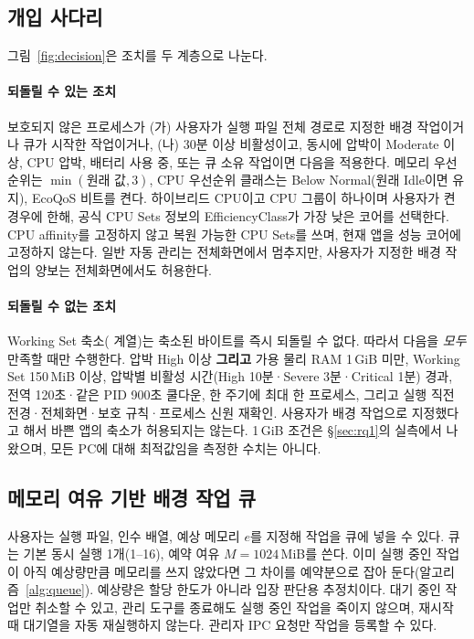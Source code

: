 \documentclass[11pt]{article}
\begin{document}
\subsection{개입 사다리}
\label{sec:ladder}
그림~\ref{fig:decision}은 조치를 두 계층으로 나눈다.

\paragraph{되돌릴 수 있는 조치}
보호되지 않은 프로세스가 (가) 사용자가 실행 파일 전체 경로로 지정한 배경 작업이거나 큐가 시작한 작업이거나, (나) 30분 이상 비활성이고, 동시에 압박이 Moderate 이상, CPU 압박, 배터리 사용 중, 또는 큐 소유 작업이면 다음을 적용한다. 메모리 우선순위는 $\min(\text{원래 값},3)$, CPU 우선순위 클래스는 Below Normal(원래 Idle이면 유지), EcoQoS 비트를 켠다\citep{mssetprocinfo,mspriority,ecoqos2021}. 하이브리드 CPU이고 CPU 그룹이 하나이며 사용자가 켠 경우에 한해, 공식 CPU Sets 정보의 EfficiencyClass가 가장 낮은 코어를 선택한다\citep{mscpusets}. CPU affinity를 고정하지 않고 복원 가능한 CPU Sets를 쓰며, 현재 앱을 성능 코어에 고정하지 않는다. 일반 자동 관리는 전체화면에서 멈추지만, 사용자가 지정한 배경 작업의 양보는 전체화면에서도 허용한다.

\paragraph{되돌릴 수 없는 조치}
Working Set 축소( 계열)는 축소된 바이트를 즉시 되돌릴 수 없다. 따라서 다음을 \emph{모두} 만족할 때만 수행한다. 압박 High 이상 \textbf{그리고} 가용 물리 RAM 1\,GiB 미만, Working Set 150\,MiB 이상, 압박별 비활성 시간(High 10분·Severe 3분·Critical 1분) 경과, 전역 120초·같은 PID 900초 쿨다운, 한 주기에 최대 한 프로세스, 그리고 실행 직전 전경·전체화면·보호 규칙·프로세스 신원 재확인. 사용자가 배경 작업으로 지정했다고 해서 바쁜 앱의 축소가 허용되지는 않는다. 1\,GiB 조건은 \S\ref{sec:rq1}의 실측에서 나왔으며, 모든 PC에 대해 최적값임을 측정한 수치는 아니다.

\subsection{메모리 여유 기반 배경 작업 큐}
\label{sec:queue}
사용자는 실행 파일, 인수 배열, 예상 메모리 $e$를 지정해 작업을 큐에 넣을 수 있다. 큐는 기본 동시 실행 1개(1--16), 예약 여유 $M=1024$\,MiB를 쓴다. 이미 실행 중인 작업이 아직 예상량만큼 메모리를 쓰지 않았다면 그 차이를 예약분으로 잡아 둔다(알고리즘~\ref{alg:queue}). 예상량은 할당 한도가 아니라 입장 판단용 추정치이다. 대기 중인 작업만 취소할 수 있고, 관리 도구를 종료해도 실행 중인 작업을 죽이지 않으며, 재시작 때 대기열을 자동 재실행하지 않는다. 관리자 IPC 요청만 작업을 등록할 수 있다.
\end{document}
